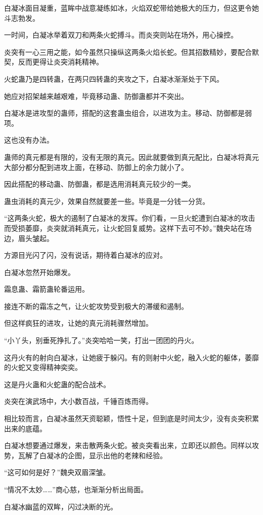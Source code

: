 \begin{this_body}
白凝冰面目凝重，蓝眸中战意凝练如冰，火焰双蛇带给她极大的压力，但这更令她斗志勃发。

一时间，白凝冰举着双刀和两条火蛇搏斗。而炎突则站在场外，用心操控。

炎突有一心三用之能，如今虽然只操纵这两条火焰长蛇。但其招数精妙，要配合默契，反而更得让炎突消耗精神。

火蛇蛊乃是四转蛊，在两只四转蛊的夹攻之下，白凝冰渐渐处于下风。

她应对招架越来越艰难，毕竟移动蛊、防御蛊都并不突出。

白凝冰是进攻型的蛊师，搭配的这套蛊虫组合，以进攻为主。移动、防御都是弱项。

这也没有办法。

蛊师的真元都是有限的，没有无限的真元。因此就要做到真元配比，白凝冰将真元大部分都分配到进攻上面，在移动、防御上的余力就小了。

因此搭配的移动蛊、防御蛊，都是选用消耗真元较少的一类。

蛊虫消耗的真元少，效果自然就要差一些。毕竟是一分钱一分货。

“这两条火蛇，极大的遏制了白凝冰的发挥。你们看，一旦火蛇遭到白凝冰的攻击而受损萎靡，炎突就消耗真元，让火蛇回复威势。这样下去可不妙。”魏央站在场边，眉头皱起。

方源目光闪了闪，没有说话，期待着白凝冰的应对。

白凝冰忽然开始爆发。

霜息蛊、霜箭蛊轮番运用。

接连不断的霜冻之气，让火蛇攻势受到极大的滞缓和遏制。

但这样疯狂的进攻，让她的真元消耗骤然增加。

“小丫头，别垂死挣扎了。”炎突哈哈一笑，打出一团团的丹火。

这丹火有的射向白凝冰，让她疲于躲闪。有的则射中火蛇，融入火蛇的躯体，萎靡的火蛇又变得精神奕奕。

这是丹火蛊和火蛇蛊的配合战术。

炎突在演武场中，大小数百战，千锤百炼而得。

相比较而言，白凝冰虽然天资聪颖，悟性十足，但到底是时间太少，没有炎突积累出来的底蕴。

白凝冰想要通过爆发，来击散两条火蛇。被炎突看出来，立即还以颜色。同样以攻势，瓦解了白凝冰的企图，显示出他的老辣和经验。

“这可如何是好？”魏央双眉深皱。

“情况不太妙……”商心慈，也渐渐分析出局面。

白凝冰幽蓝的双眸，闪过决断的光。


\end{this_body}
